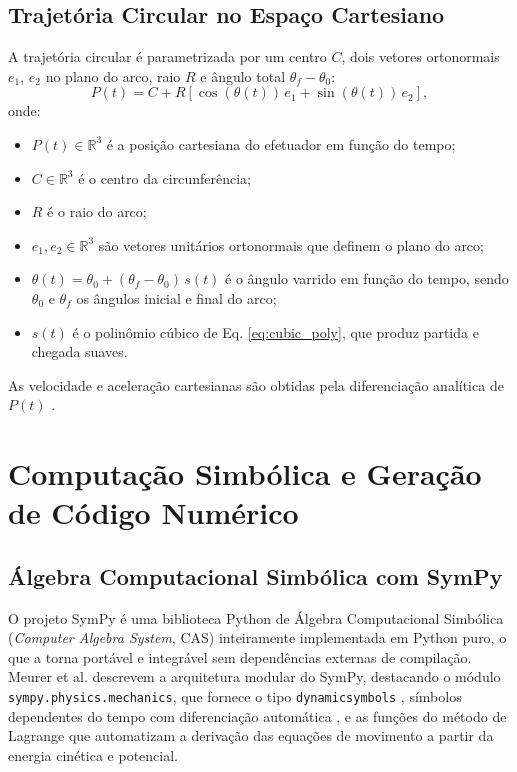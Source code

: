 \subsection{Trajetória Circular no Espaço Cartesiano}

A trajetória circular é parametrizada por um centro $C$, dois vetores ortonormais $e_1$, $e_2$ no plano do arco, raio $R$ e ângulo total $\theta_f - \theta_0$:
\begin{equation}
    P(t) = C + R\left[\cos(\theta(t))\,e_1 + \sin(\theta(t))\,e_2\right],
    \label{eq:circle_traj_review}
\end{equation}
onde:
\begin{itemize}
    \item $P(t) \in \mathbb{R}^3$ é a posição cartesiana do efetuador em função do tempo;
    \item $C \in \mathbb{R}^3$ é o centro da circunferência;
    \item $R$ é o raio do arco;
    \item $e_1, e_2 \in \mathbb{R}^3$ são vetores unitários ortonormais que definem o plano do arco;
    \item $\theta(t) = \theta_0 + (\theta_f - \theta_0)\,s(t)$ é o ângulo varrido em função do tempo, sendo $\theta_0$ e $\theta_f$ os ângulos inicial e final do arco;
    \item $s(t)$ é o polinômio cúbico de Eq. \eqref{eq:cubic_poly}, que produz partida e chegada suaves.
\end{itemize}
As velocidade e aceleração cartesianas são obtidas pela diferenciação analítica de $P(t)$ \cite{siciliano2009robotics}.

\section{Computação Simbólica e Geração de Código Numérico}

\subsection{Álgebra Computacional Simbólica com SymPy}

O projeto SymPy \cite{meurer2017sympy} é uma biblioteca Python de Álgebra Computacional Simbólica (\textit{Computer Algebra System}, CAS) inteiramente implementada em Python puro, o que a torna portável e integrável sem dependências externas de compilação. Meurer et al. \cite{meurer2017sympy} descrevem a arquitetura modular do SymPy, destacando o módulo \texttt{sympy.physics.mechanics}, que fornece o tipo \texttt{dynamicsymbols} , símbolos dependentes do tempo com diferenciação automática , e as funções do método de Lagrange que automatizam a derivação das equações de movimento a partir da energia cinética e potencial.

